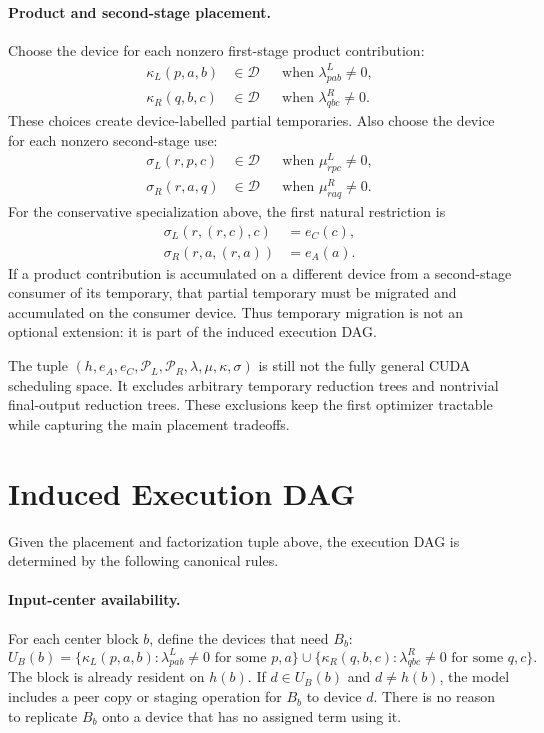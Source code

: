 \documentclass[11pt]{article}
\begin{document}
\paragraph{Product and second-stage placement.}
Choose the device for each nonzero first-stage product contribution:
\begin{align}
  \kappa_L(p,a,b) &\in \mathcal{D}
    &&\text{when } \lambda^L_{pab} \ne 0,\\
  \kappa_R(q,b,c) &\in \mathcal{D}
    &&\text{when } \lambda^R_{qbc} \ne 0.
\end{align}
These choices create device-labelled partial temporaries.  Also choose the
device for each nonzero second-stage use:
\begin{align}
  \sigma_L(r,p,c) &\in \mathcal{D}
    &&\text{when } \mu^L_{rpc} \ne 0,\\
  \sigma_R(r,a,q) &\in \mathcal{D}
    &&\text{when } \mu^R_{raq} \ne 0.
\end{align}
For the conservative specialization above, the first natural restriction is
\begin{align}
  \sigma_L(r,(r,c),c) &= e_C(c),\\
  \sigma_R(r,a,(r,a)) &= e_A(a).
\end{align}
If a product contribution is accumulated on a different device from a
second-stage consumer of its temporary, that partial temporary must be migrated
and accumulated on the consumer device.  Thus temporary migration is not an
optional extension: it is part of the induced execution DAG.

The tuple
$(h,e_A,e_C,\mathcal{P}_L,\mathcal{P}_R,\lambda,\mu,\kappa,\sigma)$ is still
not the fully general CUDA scheduling space.  It excludes arbitrary temporary
reduction trees and nontrivial final-output reduction trees.  These exclusions
keep the first optimizer tractable while capturing the main placement
tradeoffs.

\section{Induced Execution DAG}

Given the placement and factorization tuple above, the execution DAG is
determined by the following canonical rules.

\paragraph{Input-center availability.}
For each center block $b$, define the devices that need $B_b$:
\begin{equation}
  U_B(b) =
    \{ \kappa_L(p,a,b) : \lambda^L_{pab}\ne 0 \text{ for some } p,a \}
    \cup
    \{ \kappa_R(q,b,c) : \lambda^R_{qbc}\ne 0 \text{ for some } q,c \}.
\end{equation}
The block is already resident on $h(b)$.  If $d \in U_B(b)$ and $d \ne h(b)$,
the model includes a peer copy or staging operation for $B_b$ to device $d$.
There is no reason to replicate $B_b$ onto a device that has no assigned term
using it.
\end{document}
